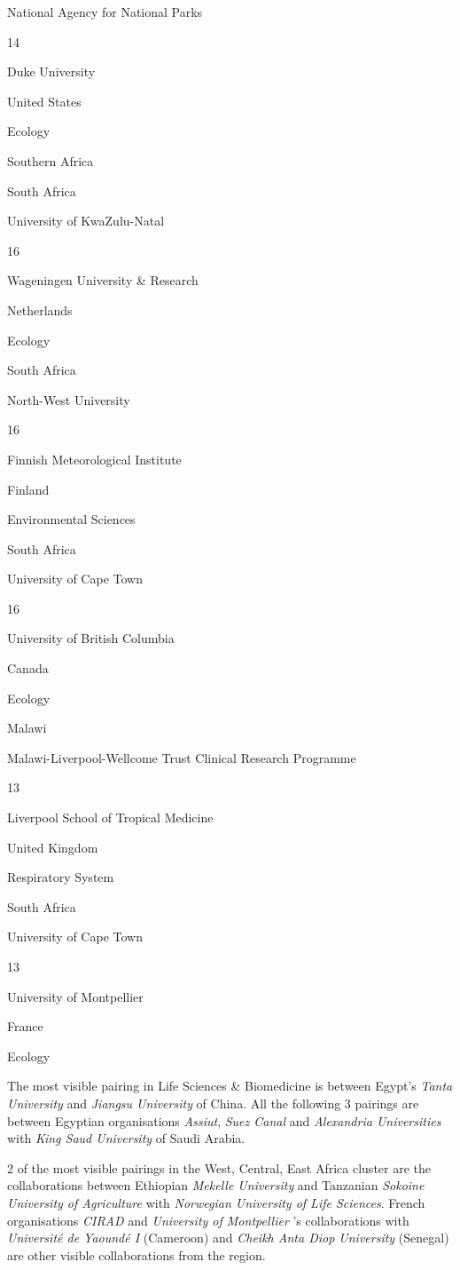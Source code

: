 \documentclass[
]{book}
\begin{document}
{National Agency for National Parks }

{14}

{Duke University }

{United States }

{Ecology }

Southern Africa

{South Africa}

{University of KwaZulu-Natal }

{16}

{Wageningen University \& Research }

{Netherlands }

{Ecology }

{South Africa}

{North-West University }

{16}

{Finnish Meteorological Institute }

{Finland }

{Environmental Sciences }

{South Africa}

{University of Cape Town }

{16}

{University of British Columbia }

{Canada }

{Ecology }

{Malawi }

{Malawi-Liverpool-Wellcome Trust Clinical Research Programme}

{13}

{Liverpool School of Tropical Medicine}

{United Kingdom}

{Respiratory System }

{South Africa}

{University of Cape Town }

{13}

{University of Montpellier }

{France }

{Ecology }

The most visible pairing in Life Sciences \& Biomedicine is between Egypt's \emph{Tanta University} and \emph{Jiangsu University} of China. All the following 3 pairings are between Egyptian organisations \emph{Assiut}, \emph{Suez Canal} and \emph{Alexandria Universities} with \emph{King Saud University} of Saudi Arabia.

2 of the most visible pairings in the West, Central, East Africa cluster are the collaborations between Ethiopian \emph{Mekelle University} and Tanzanian \emph{Sokoine University of Agriculture} with \emph{Norwegian University of Life Sciences}. French organisations \emph{CIRAD} and \emph{University of Montpellier }'s collaborations with \emph{Université de Yaoundé I} (Cameroon) and \emph{Cheikh Anta Diop University} (Senegal) are other visible collaborations from the region.
\end{document}
